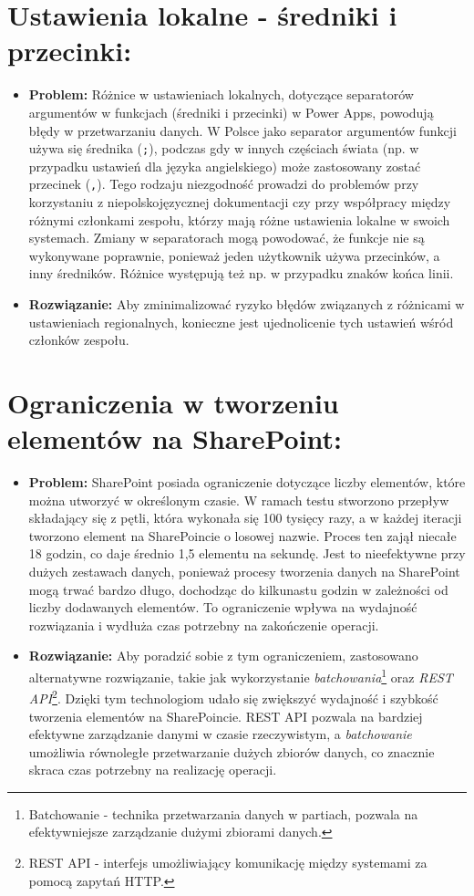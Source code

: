 \section*{Ustawienia lokalne - średniki i przecinki:}
\begin{itemize}
      \item \textbf{Problem:} Różnice w ustawieniach lokalnych, dotyczące separatorów argumentów w funkcjach (średniki i przecinki) w Power Apps, powodują błędy w przetwarzaniu danych. W Polsce jako separator argumentów funkcji używa się średnika (\texttt{;}), podczas gdy w innych częściach świata (np. w przypadku ustawień dla języka angielskiego) może zastosowany zostać przecinek (\texttt{,}). Tego rodzaju niezgodność prowadzi do problemów przy korzystaniu z niepolskojęzycznej dokumentacji czy przy współpracy między różnymi członkami zespołu, którzy mają różne ustawienia lokalne w swoich systemach. Zmiany w separatorach mogą powodować, że funkcje nie są wykonywane poprawnie, ponieważ jeden użytkownik używa przecinków, a inny średników. Różnice występują też np. w przypadku znaków końca linii.
      \item \textbf{Rozwiązanie:} Aby zminimalizować ryzyko błędów związanych z różnicami w ustawieniach regionalnych, konieczne jest ujednolicenie tych ustawień wśród członków zespołu.
\end{itemize}


\section*{Ograniczenia w tworzeniu elementów na SharePoint:}
\begin{itemize}
      \item \textbf{Problem:} SharePoint posiada ograniczenie dotyczące liczby elementów, które można utworzyć w określonym czasie. W ramach testu stworzono przepływ składający się z pętli, która wykonała się 100 tysięcy razy, a w każdej iteracji tworzono element na SharePoincie o losowej nazwie. Proces ten zajął niecałe 18 godzin, co daje średnio 1,5 elementu na sekundę. Jest to nieefektywne przy dużych zestawach danych, ponieważ procesy tworzenia danych na SharePoint mogą trwać bardzo długo, dochodząc do kilkunastu godzin w zależności od liczby dodawanych elementów. To ograniczenie wpływa na wydajność rozwiązania i wydłuża czas potrzebny na zakończenie operacji.
      \item \textbf{Rozwiązanie:} Aby poradzić sobie z tym ograniczeniem, zastosowano alternatywne rozwiązanie, takie jak wykorzystanie \emph{batchowania}\footnote{Batchowanie - technika przetwarzania danych w partiach, pozwala na efektywniejsze zarządzanie dużymi zbiorami danych.} oraz \emph{REST API}\footnote{REST API - interfejs umożliwiający komunikację między systemami za pomocą zapytań HTTP.}. Dzięki tym technologiom udało się zwiększyć wydajność i szybkość tworzenia elementów na SharePoincie. REST API pozwala na bardziej efektywne zarządzanie danymi w czasie rzeczywistym, a \emph{batchowanie} umożliwia równoległe przetwarzanie dużych zbiorów danych, co znacznie skraca czas potrzebny na realizację operacji.
\end{itemize}

